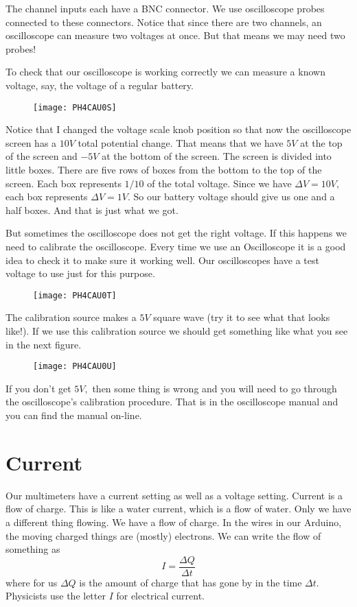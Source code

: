 The channel inputs each have a BNC connector. We use oscilloscope probes
connected to these connectors. Notice that since there are two channels, an
oscilloscope can measure two voltages at once. But that means we may need
two probes!

To check that our oscilloscope is working correctly we can measure a known
voltage, say, the voltage of a regular battery.

\begin{figure}[h!]
\texttt{[image: PH4CAU0S]}
\end{figure}Notice that I changed the voltage
scale knob position so that now the oscilloscope screen has a $10\unit{V}$
total potential change. That means that we have $5\unit{V}$ at the top of
the screen and $-5\unit{V}$ at the bottom of the screen. The screen is
divided into little boxes. There are five rows of boxes from the bottom to
the top of the screen. Each box represents $1/10$ of the total voltage.
Since we have $\Delta V=10\unit{V},$ each box represents $\Delta V=1\unit{V}%
. $ So our battery voltage should give us one and a half boxes. And that is
just what we got.

But sometimes the oscilloscope does not get the right voltage. If this
happens we need to calibrate the oscilloscope. Every time we use an
Oscilloscope it is a good idea to check it to make sure it working well. Our
oscilloscopes have a test voltage to use just for this purpose.

\begin{figure}[h!]
\texttt{[image: PH4CAU0T]}
\end{figure}

The calibration source makes a $5\unit{V}$ square wave (try it to see what
that looks like!). If we use this calibration source we should get something
like what you see in the next figure. \begin{figure}[h!]
\texttt{[image: PH4CAU0U]}
\end{figure}If you don't get $5\unit{V},$
then some thing is wrong and you will need to go through the oscilloscope's
calibration procedure. That is in the oscilloscope manual and you can find
the manual on-line.

\section{Current}

Our multimeters have a current setting as well as a voltage setting. Current
is a flow of charge. This is like a water current, which is a flow of water.
Only we have a different thing flowing. We have a flow of charge. In the
wires in our Arduino, the moving charged things are (mostly) electrons. We
can write the flow of something as 
\begin{equation*}
I=\frac{\Delta Q}{\Delta t}
\end{equation*}%
where for us $\Delta Q$ is the amount of charge that has gone by in the time 
$\Delta t.$ Physicists use the letter $I$ for electrical current.

